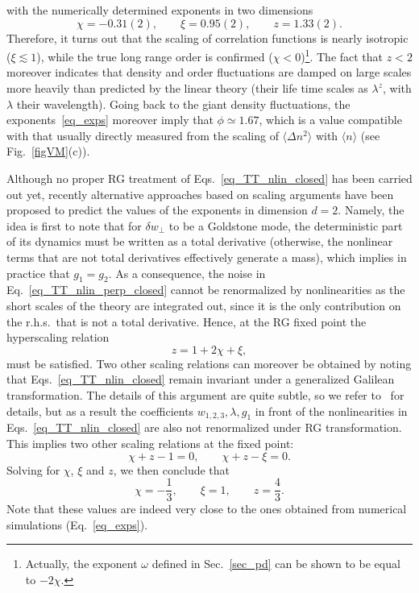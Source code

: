 with the numerically determined exponents in two dimensions
\begin{equation} \label{eq_exps}
\chi = -0.31(2) , \qquad \xi = 0.95 (2) , \qquad  z = 1.33(2) .
\end{equation}
Therefore, it turns out that the scaling of correlation functions is nearly isotropic ($\xi \lesssim 1$), 
while the true long range order is confirmed ($\chi < 0$)\footnote{Actually, the exponent $\omega$ defined in Sec.~\ref{sec_pd} can be shown to be equal to $-2\chi$.}.
The fact that $z< 2$ moreover indicates that density and order fluctuations are damped 
on large scales more heavily than predicted by the linear theory (their life time scales as $\lambda^z$, with $\lambda$ their wavelength).
Going back to the giant density fluctuations, the exponents~\eqref{eq_exps} moreover imply that $\phi \simeq 1.67$, 
which is a value compatible with that usually directly measured from the scaling of $\langle \Delta n^2\rangle$ with $\langle n \rangle$ (see Fig.~\ref{figVM}(c)).

Although no proper RG treatment of Eqs.~\eqref{eq_TT_nlin_closed} has been carried out yet, recently alternative approaches based on scaling arguments have been proposed to predict the values of the exponents in dimension $d=2$.
Namely, the idea is first to note that for $\delta w_\perp$ to be a Goldstone mode, the deterministic part of its dynamics must be written as a total derivative (otherwise, the nonlinear terms that are not total derivatives effectively generate a mass), which implies in practice that $g_1 = g_2$.
As a consequence, the noise in Eq.~\eqref{eq_TT_nlin_perp_closed} cannot be renormalized by nonlinearities as the short scales of the theory are integrated out, since it is the only contribution on the r.h.s.\ that is not a total derivative. 
Hence, at the RG fixed point the hyperscaling relation
\begin{equation*}
    z = 1 + 2\chi + \xi,
\end{equation*}
must be satisfied.
Two other scaling relations can moreover be obtained by noting that Eqs.~\eqref{eq_TT_nlin_closed} remain invariant under a generalized Galilean transformation.
The details of this argument are quite subtle, so we refer to~\cite{chate2024dynamic} for details, but as a result the coefficients $w_{1,2,3},\lambda,g_1$ in front of the nonlinearities in Eqs.~\eqref{eq_TT_nlin_closed} are also not renormalized under RG transformation.
This implies two other scaling relations at the fixed point:
\begin{equation*}
    \chi + z - 1 = 0, \qquad
    \chi + z - \xi = 0.
\end{equation*}
Solving for $\chi$, $\xi$ and $z$, we then conclude that
\begin{equation}
    \chi = -\frac{1}{3}, \qquad
    \xi = 1, \qquad
    z = \frac{4}{3}.
\end{equation}
Note that these values are indeed very close to the ones obtained from numerical simulations (Eq.~\eqref{eq_exps}).

